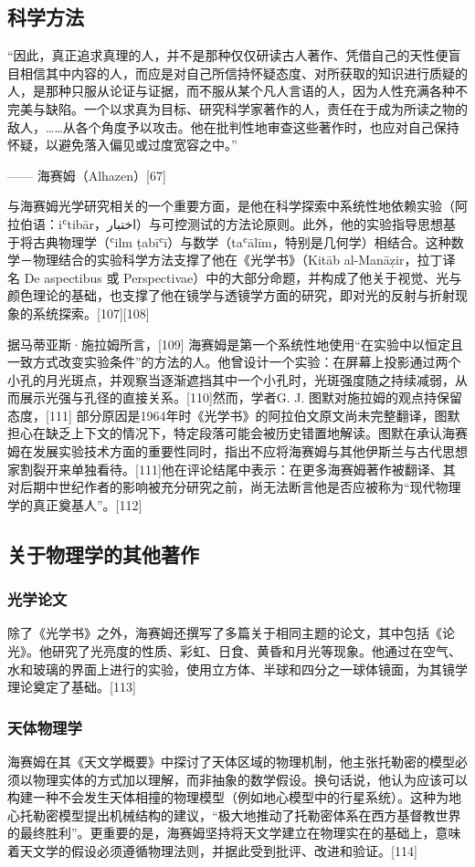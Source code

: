 \subsection{科学方法}
“因此，真正追求真理的人，并不是那种仅仅研读古人著作、凭借自己的天性便盲目相信其中内容的人，而应是对自己所信持怀疑态度、对所获取的知识进行质疑的人，是那种只服从论证与证据，而不服从某个凡人言语的人，因为人性充满各种不完美与缺陷。一个以求真为目标、研究科学家著作的人，责任在于成为所读之物的敌人，……从各个角度予以攻击。他在批判性地审查这些著作时，也应对自己保持怀疑，以避免落入偏见或过度宽容之中。”

—— 海赛姆（Alhazen）[67]

与海赛姆光学研究相关的一个重要方面，是他在科学探索中系统性地依赖实验（阿拉伯语：iʿtibār，اختبار）与可控测试的方法论原则。此外，他的实验指导思想基于将古典物理学（ʿilm ṭabīʿī）与数学（taʿālīm，特别是几何学）相结合。这种数学－物理结合的实验科学方法支撑了他在《光学书》（Kitāb al-Manāẓir，拉丁译名 De aspectibus 或 Perspectivae）中的大部分命题，并构成了他关于视觉、光与颜色理论的基础，也支撑了他在镜学与透镜学方面的研究，即对光的反射与折射现象的系统探索。[107][108]

据马蒂亚斯·施拉姆所言，[109] 海赛姆是第一个系统性地使用“在实验中以恒定且一致方式改变实验条件”的方法的人。他曾设计一个实验：在屏幕上投影通过两个小孔的月光斑点，并观察当逐渐遮挡其中一个小孔时，光斑强度随之持续减弱，从而展示光强与孔径的直接关系。[110]然而，学者G. J. 图默对施拉姆的观点持保留态度，[111] 部分原因是1964年时《光学书》的阿拉伯文原文尚未完整翻译，图默担心在缺乏上下文的情况下，特定段落可能会被历史错置地解读。图默在承认海赛姆在发展实验技术方面的重要性同时，指出不应将海赛姆与其他伊斯兰与古代思想家割裂开来单独看待。[111]他在评论结尾中表示：在更多海赛姆著作被翻译、其对后期中世纪作者的影响被充分研究之前，尚无法断言他是否应被称为“现代物理学的真正奠基人”。[112]
\subsection{关于物理学的其他著作}
\subsubsection{光学论文}
除了《光学书》之外，海赛姆还撰写了多篇关于相同主题的论文，其中包括《论光》。他研究了光亮度的性质、彩虹、日食、黄昏和月光等现象。他通过在空气、水和玻璃的界面上进行的实验，使用立方体、半球和四分之一球体镜面，为其镜学理论奠定了基础。[113]
\subsubsection{天体物理学}
海赛姆在其《天文学概要》中探讨了天体区域的物理机制，他主张托勒密的模型必须以物理实体的方式加以理解，而非抽象的数学假设。换句话说，他认为应该可以构建一种不会发生天体相撞的物理模型（例如地心模型中的行星系统）。这种为地心托勒密模型提出机械结构的建议，“极大地推动了托勒密体系在西方基督教世界的最终胜利”。更重要的是，海赛姆坚持将天文学建立在物理实在的基础上，意味着天文学的假设必须遵循物理法则，并据此受到批评、改进和验证。[114]

